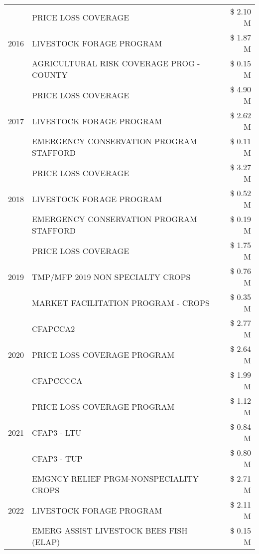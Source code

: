 \begin{tabular}{llr}
\cline{1-3}
\multirow[t]{3}{*}{2016} & PRICE LOSS COVERAGE & \$ 2.10 M \\
 & LIVESTOCK FORAGE PROGRAM & \$ 1.87 M \\
 & AGRICULTURAL RISK COVERAGE PROG - COUNTY & \$ 0.15 M \\
\cline{1-3}
\multirow[t]{3}{*}{2017} & PRICE LOSS COVERAGE & \$ 4.90 M \\
 & LIVESTOCK FORAGE PROGRAM & \$ 2.62 M \\
 & EMERGENCY CONSERVATION PROGRAM STAFFORD & \$ 0.11 M \\
\cline{1-3}
\multirow[t]{3}{*}{2018} & PRICE LOSS COVERAGE & \$ 3.27 M \\
 & LIVESTOCK FORAGE PROGRAM & \$ 0.52 M \\
 & EMERGENCY CONSERVATION PROGRAM STAFFORD & \$ 0.19 M \\
\cline{1-3}
\multirow[t]{3}{*}{2019} & PRICE LOSS COVERAGE & \$ 1.75 M \\
 & TMP/MFP 2019 NON SPECIALTY CROPS & \$ 0.76 M \\
 & MARKET FACILITATION PROGRAM - CROPS & \$ 0.35 M \\
\cline{1-3}
\multirow[t]{3}{*}{2020} & CFAPCCA2 & \$ 2.77 M \\
 & PRICE LOSS COVERAGE PROGRAM & \$ 2.64 M \\
 & CFAPCCCCA & \$ 1.99 M \\
\cline{1-3}
\multirow[t]{3}{*}{2021} & PRICE LOSS COVERAGE PROGRAM & \$ 1.12 M \\
 & CFAP3 - LTU & \$ 0.84 M \\
 & CFAP3 - TUP & \$ 0.80 M \\
\cline{1-3}
\multirow[t]{3}{*}{2022} & EMGNCY RELIEF PRGM-NONSPECIALITY CROPS & \$ 2.71 M \\
 & LIVESTOCK FORAGE PROGRAM & \$ 2.11 M \\
 & EMERG ASSIST LIVESTOCK BEES FISH (ELAP) & \$ 0.15 M \\
\cline{1-3}
\bottomrule
\end{tabular}
